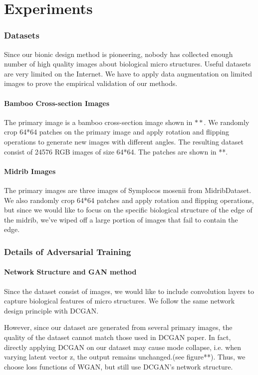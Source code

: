 \chapter{Experiments}

\subsection{Datasets}
Since our bionic design method is pioneering, nobody has collected enough number of high quality images about biological micro structures. Useful datasets are very limited on the Internet. We have to apply data augmentation on limited images to prove the empirical validation of our methods.

\subsubsection{Bamboo Cross-section Images}
The primary image is a bamboo cross-section image shown in $**$. We randomly crop 64*64 patches on the primary image and apply rotation and flipping operations to generate new images with different angles. The resulting dataset consist of 24576 RGB images of size 64*64. The patches are shown in **.

\subsubsection{Midrib Images}
The primary images are three images of Symplocos mosenii from MidribDataset. We also randomly crop 64*64 patches and apply rotation and flipping operations, but since we would like to focus on the specific biological structure of the edge of the midrib, we’ve wiped off a large portion of images that fail to contain the edge. 

\subsection{Details of Adversarial Training}

\subsubsection{Network Structure and GAN method}
Since the dataset consist of images, we would like to include convolution layers to capture biological features of micro structures. We follow the same network design principle with DCGAN.

However, since our dataset are generated from several primary images, the quality of the dataset cannot match those used in DCGAN paper. In fact, directly applying DCGAN on our dataset may cause mode collapse, i.e. when varying latent vector z, the output remains unchanged.(see figure**). Thus, we choose loss functions of WGAN, but still use DCGAN’s network structure.

